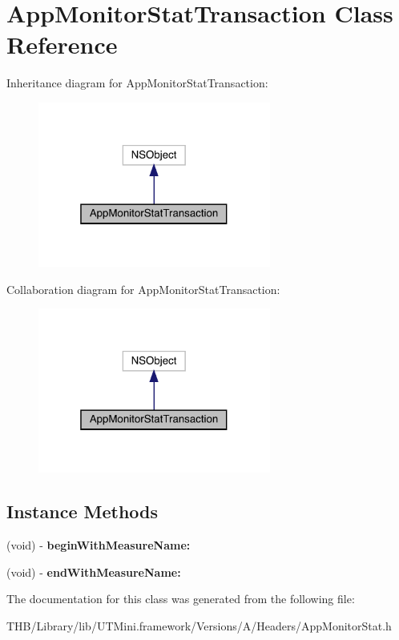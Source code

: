 \hypertarget{interface_app_monitor_stat_transaction}{}\section{App\+Monitor\+Stat\+Transaction Class Reference}
\label{interface_app_monitor_stat_transaction}


Inheritance diagram for App\+Monitor\+Stat\+Transaction\+:\nopagebreak
\begin{figure}[H]
\begin{center}
\leavevmode
\includegraphics[width=217pt]{interface_app_monitor_stat_transaction__inherit__graph}
\end{center}
\end{figure}


Collaboration diagram for App\+Monitor\+Stat\+Transaction\+:\nopagebreak
\begin{figure}[H]
\begin{center}
\leavevmode
\includegraphics[width=217pt]{interface_app_monitor_stat_transaction__coll__graph}
\end{center}
\end{figure}
\subsection*{Instance Methods}
\begin{DoxyCompactItemize}
\item 
\mbox{\label{interface_app_monitor_stat_transaction_a32d43b10a0825ab840ee76a9c4d01845}} 
(void) -\/ {\bfseries begin\+With\+Measure\+Name\+:}
\item 
\mbox{\label{interface_app_monitor_stat_transaction_a6b66c48e0a5f02efcd1f62f97341c673}} 
(void) -\/ {\bfseries end\+With\+Measure\+Name\+:}
\end{DoxyCompactItemize}


The documentation for this class was generated from the following file\+:\begin{DoxyCompactItemize}
\item 
T\+H\+B/\+Library/lib/\+U\+T\+Mini.\+framework/\+Versions/\+A/\+Headers/App\+Monitor\+Stat.\+h\end{DoxyCompactItemize}
